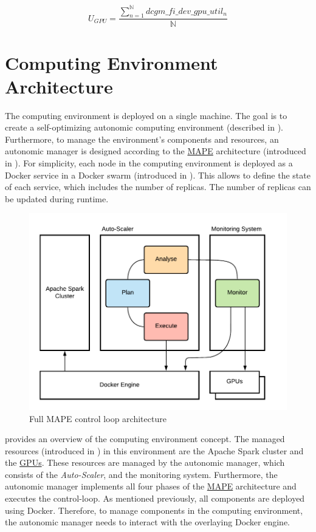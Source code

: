 \begin{equation}
U_{GPU} = \dfrac{\sum_{n=1}^{\mathbb{N}}dcgm\_fi\_dev\_gpu\_util_{n}}{\mathbb{N}}
\label{eq:05_metrics_gpu}
\end{equation}


\section{Computing Environment Architecture}
\label{sec:05_env}
The computing environment is deployed on a single machine.
The goal is to create a self-optimizing autonomic computing environment (described in ).
Furthermore, to manage the environment's components and resources, an autonomic manager is designed according to the \hyperlink{abbr:mape}{MAPE} architecture (introduced in ).
For simplicity, each node in the computing environment is deployed as a Docker service in a Docker swarm (introduced in ).
This allows to define the state of each service, which includes the number of replicas. The number of replicas can be updated during runtime.


\begin{figure}[h]
\centering
\includegraphics[scale=1]{images/05_conceptual_design/autonomic_manager/control_loop}
\caption{Full MAPE control loop architecture}
\label{fig:05_am_monitoring_loop_arch}
\end{figure}
 provides an overview of the computing environment concept.
The managed resources (introduced in ) in this environment are the Apache Spark cluster and the \hyperlink{abbr:gpu}{GPUs}.
These resources are managed by the autonomic manager, which consists of the \textit{Auto-Scaler}, and the monitoring system. Furthermore, the autonomic manager implements all four phases of the \hyperlink{abbr:mape}{MAPE} architecture and executes the control-loop.
As mentioned previously, all components are deployed using Docker. Therefore, to manage components in the computing environment, the autonomic manager needs to interact with the overlaying Docker engine.


